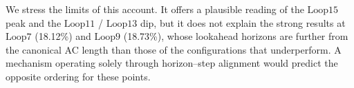 We stress the limits of this account. It offers a plausible reading of the $\text{Loop}15$ peak and the $\text{Loop}11$ / $\text{Loop}13$ dip, but it does not explain the strong results at $\text{Loop}7$ (18.12\%) and $\text{Loop}9$ (18.73\%), whose lookahead horizons are further from the canonical AC length than those of the configurations that underperform. A mechanism operating solely through horizon–step alignment would predict the opposite ordering for these points.






























